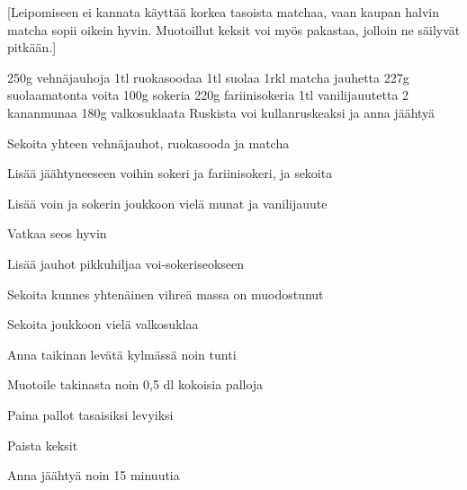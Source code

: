 [Leipomiseen ei kannata käyttää korkea tasoista matchaa, vaan kaupan halvin matcha sopii oikein hyvin. Muotoillut keksit voi myös pakastaa, jolloin ne säilyvät pitkään.]

\begin{step}
  250g vehnäjauhoja
  1tl ruokasoodaa
  1tl suolaa
  1rkl matcha jauhetta
  227g suolaamatonta voita
  100g sokeria
  220g fariinisokeria
  1tl vanilijauutetta
  2 kananmunaa
  180g valkosuklaata
  \method
  Ruskista voi kullanruskeaksi ja anna jäähtyä

  Sekoita yhteen vehnäjauhot, ruokasooda ja matcha

  Lisää jäähtyneeseen voihin sokeri ja fariinisokeri, ja sekoita

  Lisää voin ja sokerin joukkoon vielä munat ja vanilijauute

  Vatkaa seos hyvin

  Lisää jauhot pikkuhiljaa voi-sokeriseokseen

  Sekoita kunnes yhtenäinen vihreä massa on muodostunut

  Sekoita joukkoon vielä valkosuklaa

  Anna taikinan levätä kylmässä noin tunti

  Muotoile takinasta noin 0,5 dl kokoisia palloja

  Paina pallot tasaisiksi levyiksi

 Paista keksit 

 Anna jäähtyä noin 15 minuutia
\end{step}
